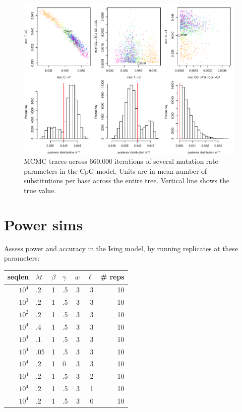 \documentclass{article}
\theoremstyle{plain}
\theoremstyle{definition}
\begin{document}
\begin{figure}
  \begin{center}
    \includegraphics{../writeup-plots/selsims-2013-06-03-13-17-0790276-mutrates}
  \end{center}
  \caption{
  MCMC traces across 660,000 iterations of several mutation rate parameters in the CpG model.
  Units are in mean number of substitutions per base across the entire tree.
  Vertical line shows the true value.
  }
\end{figure}

\section{Power sims}

Assess power and accuracy in the Ising model, by running replicates at these parameters:

\begin{tabular}{|rlllrrr|}
  \hline
  seqlen   &  $\lambda t$   &  $\beta$  &  $\gamma$  &  $w$ &  $\ell$   & \# reps \\
  \hline
  $10^4$    &   .2  &   1   &   .5  &   3   &   3   &   10  \\
  $10^3$    &   .2  &   1   &   .5  &   3   &   3   &   10  \\
  $10^2$    &   .2  &   1   &   .5  &   3   &   3   &   10  \\
  \hline
  $10^4$    &   .4  &   1   &   .5  &   3   &   3   &   10  \\
  $10^4$    &   .1  &   1   &   .5  &   3   &   3   &   10  \\
  $10^4$    &   .05  &   1   &   .5  &   3   &   3   &   10  \\
  \hline
  $10^4$    &   .2  &   1   &   0  &   3   &   3   &   10  \\
  \hline
  $10^4$    &   .2  &   1   &   .5  &   3   &   2   &   10  \\
  $10^4$    &   .2  &   1   &   .5  &   3   &   1   &   10  \\
  $10^4$    &   .2  &   1   &   .5  &   3   &   0   &   10  \\
  \hline
\end{tabular}
\end{document}
